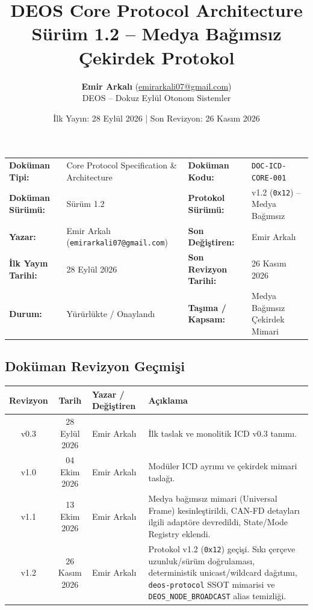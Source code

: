 \documentclass[a4paper,10pt]{article}
\title{\textbf{DEOS Core Protocol Architecture}\\
\large Sürüm 1.2 -- Medya Bağımsız Çekirdek Protokol}
\author{\textbf{Emir Arkalı} (\href{mailto:emirarkali07@gmail.com}{emirarkali07@gmail.com})\\DEOS -- Dokuz Eylül Otonom Sistemler}
\date{İlk Yayın: 28 Eylül 2026 \quad | \quad Son Revizyon: 26 Kasım 2026}
\newcommand{\hex}[1]{\texttt{0x#1}}
\newcommand{\code}[1]{\texttt{#1}}
\begin{document}
\maketitle

\begin{center}
\small
\begin{tabularx}{\textwidth}{ll lX}
\toprule
\textbf{Doküman Tipi:} & Core Protocol Specification \& Architecture & \textbf{Doküman Kodu:} & \code{DOC-ICD-CORE-001} \\
\textbf{Doküman Sürümü:} & Sürüm 1.2 & \textbf{Protokol Sürümü:} & v1.2 (\hex{12}) -- Medya Bağımsız \\
\textbf{Yazar:} & Emir Arkalı (\texttt{emirarkali07@gmail.com}) & \textbf{Son Değiştiren:} & Emir Arkalı \\
\textbf{İlk Yayın Tarihi:} & 28 Eylül 2026 & \textbf{Son Revizyon Tarihi:} & 26 Kasım 2026 \\
\textbf{Durum:} & Yürürlükte / Onaylandı & \textbf{Taşıma / Kapsam:} & Medya Bağımsız Çekirdek Mimari \\
\bottomrule
\end{tabularx}
\end{center}

\subsection*{Doküman Revizyon Geçmişi}
\begin{center}
\small
\begin{tabularx}{\textwidth}{c c l X}
\toprule
\textbf{Revizyon} & \textbf{Tarih} & \textbf{Yazar / Değiştiren} & \textbf{Açıklama} \\
\midrule
v0.3 & 28 Eylül 2026 & Emir Arkalı & İlk taslak ve monolitik ICD v0.3 tanımı. \\
v1.0 & 04 Ekim 2026 & Emir Arkalı & Modüler ICD ayrımı ve çekirdek mimari taslağı. \\
v1.1 & 13 Ekim 2026 & Emir Arkalı & Medya bağımsız mimari (Universal Frame) kesinleştirildi, CAN-FD detayları ilgili adaptöre devredildi, State/Mode Registry eklendi. \\
v1.2 & 26 Kasım 2026 & Emir Arkalı & Protokol v1.2 (\hex{12}) geçişi. Sıkı çerçeve uzunluk/sürüm doğrulaması, deterministik unicast/wildcard dağıtımı, \code{deos-protocol} SSOT mimarisi ve \code{DEOS\_NODE\_BROADCAST} alias temizliği. \\
\bottomrule
\end{tabularx}
\end{center}
\vspace{0.8em}
\end{document}
